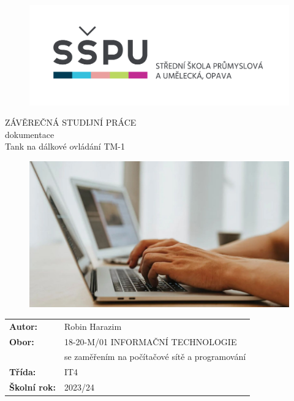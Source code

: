 \documentclass[12pt, a4paper,
oneside
openany
]{report}
\title{\nazevPrace} %
\author{\jmenoAutora} %
\date{\datumOdevzdani} %
\newcommand\obor{INFORMAČNÍ TECHNOLOGIE} %
\newcommand\kodOboru{18-20-M/01} %
\newcommand\zamereni{se zaměřením na počítačové sítě a programování} %
\newcommand\trida{IT4} %
\newcommand\jmenoAutora{Robin Harazim}  %
\newcommand\skolniRok{2023/24} %
\newcommand\nazevPrace{Tank na dálkové ovládání TM-1} %
\begin{document}
	
    \setcounter{page}{1}
    \pagestyle{empty}

	
	{\selectfont
		\begin{figure}[h]
			\centering
			\includegraphics[width=0.6\linewidth]{image/logo-skoly.png} 
		\end{figure}
		
		
		{\bfseries %
			\begin{center}
				\vspace{0.025 \textheight}
				\LARGE{ZÁVĚREČNÁ STUDIJNÍ PRÁCE}\\
				\large{dokumentace}\\
				\vspace{0.075 \textheight}
				\LARGE {\nazevPrace}\\
			\end{center}  
		}%
		
		\begin{figure}[ht]
			\centering
			\includegraphics[width=0.8\linewidth]{image/programovani-02.jpg} 
		\end{figure}
		
		\vspace{0.02 \textheight}
		\begin{table}[h!]
			\begin{tabular}{ll}
				\textbf{Autor:} & \jmenoAutora\\ 
				\textbf{Obor:} & \kodOboru { } \obor\\
				\textbf{} & \zamereni\\
				\textbf{Třída:} & \trida\\
				\textbf{Školní rok:} & \skolniRok\\
			\end{tabular}
			
		\end{table}		
	}
	
\end{document}
